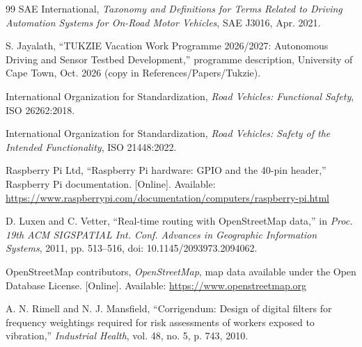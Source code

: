 \begin{thebibliography}{99}
 SAE International, \emph{Taxonomy and Definitions for Terms Related to Driving Automation Systems for On-Road Motor Vehicles}, SAE J3016, Apr. 2021.

 S. Jayalath, ``TUKZIE Vacation Work Programme 2026/2027: Autonomous Driving and Sensor Testbed Development,'' programme description, University of Cape Town, Oct. 2026 (copy in References/Papers/Tukzie).

 International Organization for Standardization, \emph{Road Vehicles: Functional Safety}, ISO 26262:2018.

 International Organization for Standardization, \emph{Road Vehicles: Safety of the Intended Functionality}, ISO 21448:2022.

 Raspberry Pi Ltd, ``Raspberry Pi hardware: GPIO and the 40-pin header,'' Raspberry Pi documentation. [Online]. Available: \url{https://www.raspberrypi.com/documentation/computers/raspberry-pi.html}

 D. Luxen and C. Vetter, ``Real-time routing with OpenStreetMap data,'' in \emph{Proc. 19th ACM SIGSPATIAL Int. Conf. Advances in Geographic Information Systems}, 2011, pp. 513--516, doi: 10.1145/2093973.2094062.

 OpenStreetMap contributors, \emph{OpenStreetMap}, map data available under the Open Database License. [Online]. Available: \url{https://www.openstreetmap.org}

 A. N. Rimell and N. J. Mansfield, ``Corrigendum: Design of digital filters for frequency weightings required for risk assessments of workers exposed to vibration,'' \emph{Industrial Health}, vol. 48, no. 5, p. 743, 2010.

\end{thebibliography}
